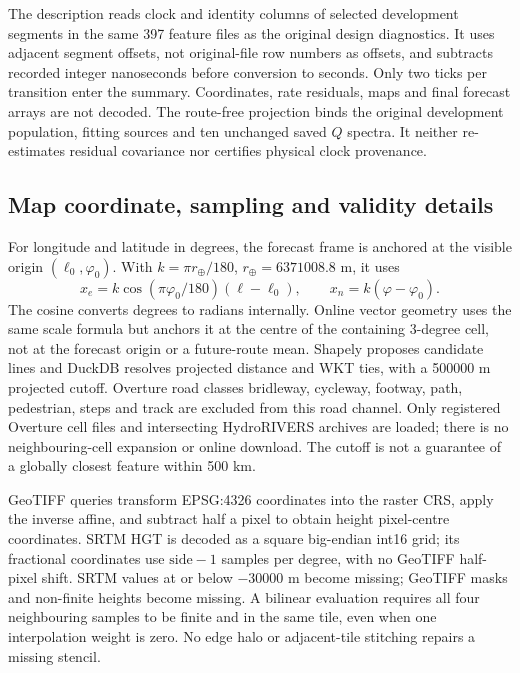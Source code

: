 \documentclass[11pt]{article}
\begin{document}
The description reads clock and identity columns of selected development
segments in the same 397 feature files as the original design diagnostics.
It uses adjacent segment offsets, not original-file row numbers as offsets,
and subtracts recorded integer nanoseconds before conversion to seconds.
Only two ticks per transition enter the summary. Coordinates, rate residuals,
maps and final forecast arrays are not decoded. The route-free projection
 binds the original
development population, fitting sources and ten unchanged saved $Q$ spectra.
It neither re-estimates residual covariance nor certifies physical clock provenance.

\subsection{Map coordinate, sampling and validity details}
\label{sec:map-query-details}
For longitude and latitude in degrees, the forecast frame is anchored at
the visible origin \((\ell_0,\varphi_0)\). With
\(k=\pi r_\oplus/180\), \(r_\oplus=6371008.8\) m, it uses
\begin{equation}
 x_e=k\cos(\pi\varphi_0/180)(\ell-\ell_0),\qquad
 x_n=k(\varphi-\varphi_0).
 \label{eq:map-frames}
\end{equation}
The cosine converts degrees to radians internally. Online vector geometry
uses the same scale formula but anchors it at the centre of the containing
3-degree cell, not at the forecast origin or a future-route mean. Shapely
proposes candidate lines and DuckDB resolves projected distance and WKT ties,
with a 500000 m projected cutoff. Overture road classes bridleway, cycleway,
footway, path, pedestrian, steps and track are excluded from this road channel.
Only registered Overture cell files and intersecting HydroRIVERS archives
are loaded; there is no neighbouring-cell expansion or online download.
The cutoff is not a guarantee of a globally closest feature within 500 km.

GeoTIFF queries transform EPSG:4326 coordinates into the raster CRS, apply
the inverse affine, and subtract half a pixel to obtain height pixel-centre
coordinates. SRTM HGT is decoded as a square big-endian int16 grid; its
fractional coordinates use \(\mathrm{side}-1\) samples per degree, with no
GeoTIFF half-pixel shift. SRTM values at or below \(-30000\) m become missing;
GeoTIFF masks and non-finite heights become missing. A bilinear evaluation
requires all four neighbouring samples to be finite and in the same tile,
even when one interpolation weight is zero. No edge halo or adjacent-tile
stitching repairs a missing stencil.
\end{document}
